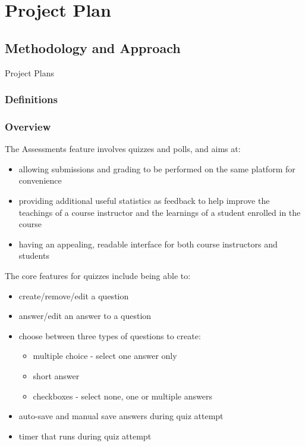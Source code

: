 \chapter{Project Plan}\label{ch:project-plan}

\section{Methodology and Approach}
Project Plans

\subsection{Definitions}

\subsection{Overview}
The Assessments feature involves quizzes and polls, and aims at:

\begin{itemize}
    \item allowing submissions and grading to be performed on the same platform for convenience
    \item providing additional useful statistics as feedback to help improve the teachings of a course instructor and the learnings of a student enrolled in the course
    \item having an appealing, readable interface for both course instructors and students
\end{itemize}

The core features for quizzes include being able to:
\begin{itemize}
    \item create/remove/edit a question
    \item answer/edit an answer to a question
    \item choose between three types of questions to create:
    \begin{itemize}
    	\item multiple choice - select one answer only
    	\item short answer
    	\item checkboxes - select none, one or multiple answers
    \end{itemize}
    \item auto-save and manual save answers during quiz attempt
    \item timer that runs during quiz attempt
\end{itemize}

